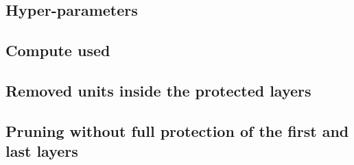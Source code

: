 \subsection{Hyper-parameters}
\begin{table}[h]
  \centering
  \caption{Settings of every arm, read from the configuration files.}
  \resizebox{\linewidth}{!}{}
\end{table}

\subsection{Compute used}
\begin{table}[h]
  \centering
  \caption{Wall-clock hours of the recorded stages, summed over all runs of each experiment.
  Development stages ran on NVIDIA T4 GPUs; the final timing ran on the rented timing GPU.}
  \resizebox{\linewidth}{!}{}
\end{table}

\subsection{Removed units inside the protected layers}
\begin{table}[h]
  \centering
  \caption{Every pruning run: its removed units, how many lie inside the first two and the last
  decoder layer and their share of the removed parameters. Since the amendment of 2026-11-16 no
  unit of these layers is removed, so every current run reads 0.}
  \resizebox{\linewidth}{!}{}
\end{table}

\subsection{Pruning without full protection of the first and last layers}
\begin{table}[h]
  \centering
  \caption{The original pre-registered  (magnitude and activation at ,
  seed 0): one global per-parameter ranking over layers, attention groups and channel groups,
  with the units inside the first two and the last decoder layer removable. Most of their
  removed units fell inside those three layers, which led to the amendments that protect every
  unit of them (2026-11-16) and remove an equal number of channel groups per layer
  (2026-11-17; pre-registration section 10). Superseded, exploratory, outside H1--H4.}
  \resizebox{\linewidth}{!}{}
\end{table}

